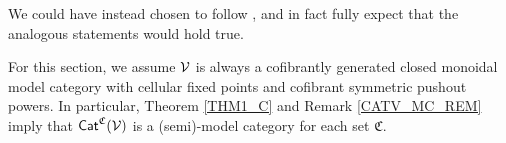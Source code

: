 \documentclass[a4paper,10pt
,draft
]{article}%
\renewcommand{\F}{\mathcal F}
\renewcommand{\1}{\eta}%
\begin{document}


\begin{remark}
      We could have instead chosen to follow \cite{Mur15}, and in fact
      fully expect that the analogous statements would hold true.
\end{remark}

\begin{convention}
      For this section, we assume $\mathcal V$ is always a cofibrantly generated closed monoidal model category with cellular fixed points
      and cofibrant symmetric pushout powers.
      In particular, Theorem \ref{THM1_C} and Remark \ref{CATV_MC_REM} imply that $\mathsf{Cat}^{\mathfrak C}(\mathcal V)$ is a (semi)-model category for each set $\mathfrak C$.      
\end{convention}




\end{document}
